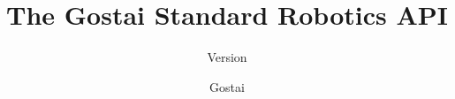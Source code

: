 \documentclass[openright,twoside,11pt]{book}
\title{The Gostai Standard Robotics API}
\subtitle{Version \VcsDescription}
\author{Gostai}
\begin{document}
\maketitle
\tableofcontents
\savesections
\raisesections
\let\chapter\section

\restoresections
\chapterIndex
\end{document}
